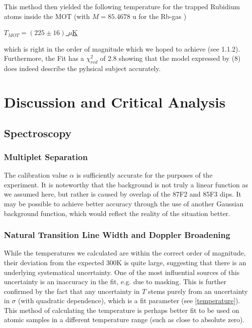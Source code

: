 \documentclass[12pt, a4paper]{article}
\begin{document}
\bigskip
This method then yielded the following temperature for the trapped Rubidium atoms inside the MOT (with $M=85.4678$ u for the Rb-gas \cite{Rbmass})

\bigskip
\underline{$T_{MOT}= (225 \pm 16)$ $\mu$K}

\bigskip
which is right in the order of magnitude which we hoped to achieve (see 1.1.2).
Furthermore, the Fit has a $\chi^2_{red}$ of 2.8 showing that the model expressed by (8) does indeed describe the pyhsical subject accurately.

































\section{Discussion and Critical Analysis}

\subsection{Spectroscopy}
\subsubsection{Multiplet Separation}
The calibration value $\alpha$ is sufficiently accurate for the purposes of the experiment. It is noteworthy that the background is not truly a linear function as we assumed here, but rather is caused by overlap of the 87F2 and 85F3 dips. It may be possible to achieve better accuracy through the use of another Gaussian background function, which would reflect the reality of the situation better.

\subsubsection{Natural Transition Line Width and Doppler Broadening}
While the temperatures we calculated are within the correct order of magnitude, their deviation from the expected $300\si{\kelvin}$ is quite large, suggesting that there is an underlying systematical uncertainty. One of the most influential sources of this uncertainty is an inaccuracy in the fit, e.g. due to masking. This is further confirmed by the fact that any uncertainty in $T$ stems purely from an uncertainty in $\sigma$ (with quadratic dependence), which is a fit parameter (see \autoref{temperature}). This method of calculating the temperature is perhaps better fit to be used on atomic samples in a different temperature range (such as close to absolute zero).
\end{document}
